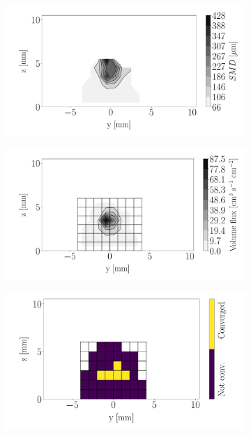 \begin{figure}[h!]
\centering
\begin{subfigure}[b]{0.3\textwidth}
	\centering
   \includegraphics[scale=\scaleSLIJICF]{./part2_developments/figures_ch5_resolved_JICF/injectors_SLI/uG75_dx20_x05_SMD_map}
\end{subfigure}
   \hspace{0.17in}
\begin{subfigure}[b]{0.3\textwidth}
	\centering
   \includegraphics[scale=\scaleSLIJICF]{./part2_developments/figures_ch5_resolved_JICF/injectors_SLI/uG75_dx20_x05_volume_flux_map}
\end{subfigure}
   \hspace{0.17in}
\begin{subfigure}[b]{0.3\textwidth}
	\centering
   \includegraphics[scale=\scaleSLIJICF]{./part2_developments/figures_ch5_resolved_JICF/injectors_SLI/uG75_dx20_x05_convergence_map}
\end{subfigure}


\end{figure}
